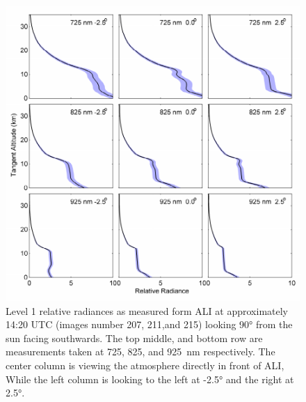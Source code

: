 \begin{figure}
\includegraphics[width=1.0\textwidth]{./Images/5-2-AliRadiances.pdf}
    \caption[TODO:Write This]{Level 1 relative radiances as measured form ALI at approximately 14:20 UTC (images number 207, 211,and 215) looking 90\si{\degree} from the sun facing southwards. The top middle, and bottom row are measurements taken at 725, 825, and 925~nm respectively. The center column is viewing the atmosphere directly in front of ALI, While the left column is looking to the left at -2.5\si{\degree} and the right at 2.5\si{\degree}. }
    \label{fig:5.2:AliRadiances}
\end{figure}

